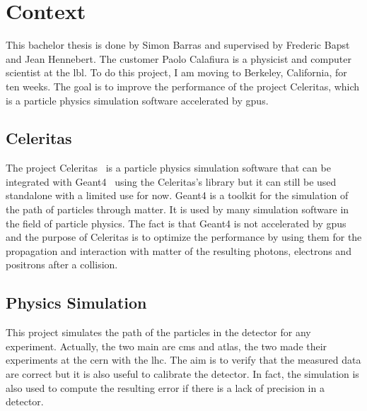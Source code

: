 \chapter{Context}
\label{spec:ch:context}

This bachelor thesis is done by Simon Barras and supervised by Frederic Bapst and Jean Hennebert.
The customer Paolo Calafiura is a physicist and computer scientist at the \acrfull{lbl}.
To do this project, I am moving to Berkeley, California, for ten weeks.
The goal is to improve the performance of the project Celeritas, which is a particle physics simulation software accelerated by \acrshort{gpu}s.




\section{Celeritas}
\label{spec:ch:context:celeritas}

The project Celeritas~\cite{Celeritas-Project} is a particle physics simulation software that can be integrated with Geant4~\cite{Geant4} using the Celeritas's library but it can still be used standalone with a limited use for now.
Geant4 is a toolkit for the simulation of the path of particles through matter.
It is used by many simulation software in the field of particle physics.
The fact is that Geant4 is not accelerated by \acrshort{gpu}s and the purpose of Celeritas is to optimize the performance by using them for the propagation and interaction with matter of the resulting photons, electrons and positrons after a collision.



\section{Physics Simulation}
\label{spec:ch:context:physics-simulation}

This project simulates the path of the particles in the detector for any experiment.
Actually, the two main are \acrshort{cms} and \acrshort{atlas}, the two made their experiments at the \acrfull{cern} with the \acrfull{lhc}.
The aim is to verify that the measured data are correct but it is also useful to calibrate the detector.
In fact, the simulation is also used to compute the resulting error if there is a lack of precision in a detector.

